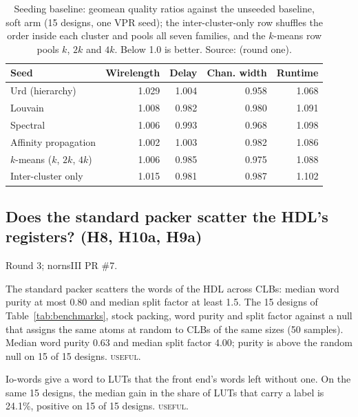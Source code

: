 \begin{table}[t]
\caption{Seeding baseline: geomean quality ratios against the unseeded baseline, soft arm (15 designs, one VPR seed); the inter-cluster-only row shuffles the order inside each cluster and pools all seven families, and the $k$-means row pools $k$, $2k$ and $4k$. Below 1.0 is better. Source:  (round one).}
\label{tab:qor}
\centering
\scriptsize
\begin{tabular}{@{}lrrrr@{}}
\toprule
Seed & Wirelength & Delay & Chan. width & Runtime \\
\midrule
Urd (hierarchy) & 1.029 & 1.004 & 0.958 & 1.068 \\
Louvain & 1.008 & 0.982 & 0.980 & 1.091 \\
Spectral & 1.006 & 0.993 & 0.968 & 1.098 \\
Affinity propagation & 1.002 & 1.003 & 0.982 & 1.086 \\
$k$-means ($k$, $2k$, $4k$) & 1.006 & 0.985 & 0.975 & 1.088 \\
Inter-cluster only & 1.015 & 0.981 & 0.987 & 1.102 \\
\bottomrule
\end{tabular}
\end{table}

\subsection{Does the standard packer scatter the HDL's registers? (H8, H10a, H9a)}
\label{sec:e-scatter}

 Round 3; nornsIII PR \#7.

 The standard packer scatters the words of the HDL across CLBs: median word purity at most 0.80 and median split factor at least 1.5.
 The 15 designs of Table~\ref{tab:benchmarks}, stock packing, word purity and split factor against a null that assigns the same atoms at random to CLBs of the same sizes (50 samples).
 Median word purity 0.63 and median split factor 4.00; purity is above the random null on 15 of 15 designs. %
 \textsc{useful}.

 Io-words give a word to LUTs that the front end's words left without one.
 On the same 15 designs, the median gain in the share of LUTs that carry a label is 24.1\%, positive on 15 of 15 designs. %
 \textsc{useful}.

